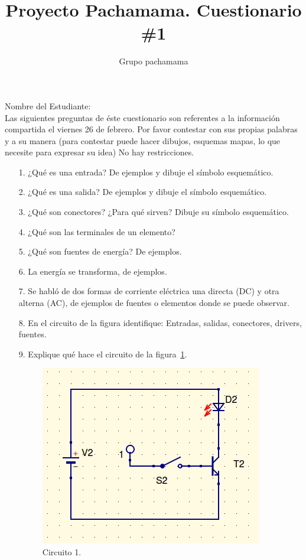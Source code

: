 \documentclass{article}
\title{Proyecto Pachamama. Cuestionario \#1}
\author{Grupo pachamama}
\begin{document}
\maketitle
Nombre del Estudiante:\\

Las siguientes preguntas de éste cuestionario son referentes a la información compartida el viernes 26 de febrero.
Por favor contestar con sus propias palabras y a su manera (para contestar puede hacer dibujos, esquemas mapas, lo que necesite para expresar su idea) No hay restricciones.

\begin{itemize}
		\item [1.] ¿Qué es una entrada? De ejemplos y dibuje el símbolo esquemático. 
		\item [2.] ¿Qué es una salida? De ejemplos y dibuje el símbolo esquemático.
		\item [3.] ¿Qué son conectores? ¿Para qué sirven? Dibuje su símbolo esquemático.
		\item [4.] ¿Qué son las terminales de un elemento?
		\item [5.] ¿Qué son fuentes de energía? De ejemplos.
		\item [6.] La energía se transforma, de ejemplos.
		\item [7.] Se habló de dos formas de corriente eléctrica una directa (DC) y otra alterna (AC), de ejemplos
				de fuentes o elementos donde se puede observar.
		\item [8.] En el circuito de la figura identifique: Entradas, salidas, conectores, drivers, fuentes.
		\item [9.] Explique qué hace el circuito de la figura~\ref{fig:1}.

\begin{figure}[hptp]
    \centering
    \includegraphics[scale=0.35]{circuito2.png}
    \caption{Circuito 1.}
    \label{fig:1}
\end{figure}
\smallskip


\end{itemize}
\end{document}
